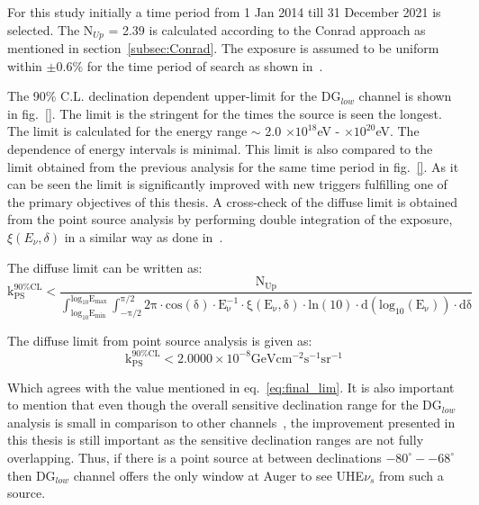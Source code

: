 For this study initially a time period from 1 Jan 2014 till 31 December 2021 is selected. The N$_{Up}$ = 2.39 is calculated according to the Conrad approach as mentioned in section~\ref{subsec:Conrad}. The exposure is assumed to be uniform within $\pm 0.6\%$ for the time period of search as shown in~\cite{PierreAuger:2017pzq}. 

The 90\% C.L. declination dependent upper-limit for the DG$_{low}$ channel is shown in fig.~\ref{}. The limit is the stringent for the times the source is seen the longest. The limit is calculated for the energy range $\sim$ 2.0 $\times 10^{18}$eV - $\times 10^{20}$eV. The dependence of energy intervals is minimal. This limit is also compared to the limit obtained from the previous analysis for the same time period in fig.~\ref{}. As it can be seen the limit is significantly improved with new triggers fulfilling one of the primary objectives of this thesis.     
A cross-check of the diffuse limit is obtained from the point source analysis by performing double integration of the exposure, $\xi(E_{\nu}, \delta)$ in a similar way as done in~\cite{gap_note_2013}.

The diffuse limit can be written as:
\begin{equation}
  \mathrm{k_{PS}^{90\%CL} < \frac{N_{Up}}{\int_{log_{10}E_{min}}^{log_{10}E_{max}} \int_{-\pi/2}^{\pi/2}2\pi \cdot cos(\delta) \cdot E_{\nu}^{-1} \cdot \xi(E_{\nu}, \delta) \cdot ln(10) \cdot d(log_{10}(E_{\nu})) \cdot d\delta}} 
\end{equation}

The diffuse limit from point source analysis is given as: 
\begin{equation}
  \mathrm{k_{PS}^{90\%CL} < 2.0000 \times 10^{-8} GeV cm^{-2} s^{-1} sr^{-1}}
\end{equation}

Which agrees with the value mentioned in eq.~\ref{eq:final_lim}. It is also important to mention that even though the overall sensitive declination range for the DG$_{low}$ analysis is small in comparison to other channels~\cite{Aab_2019_point}, the improvement presented in this thesis is still important as the sensitive declination ranges are not fully overlapping. Thus, if there is a point source at between declinations $-80^{\circ}- -68^{\circ}$ then DG$_{low}$ channel offers the only window at Auger to see UHE$\nu_s$ from such a source.  




